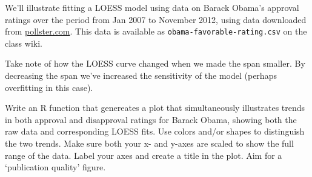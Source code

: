 We'll illustrate fitting a LOESS model using data on Barack Obama's
approval ratings over the period from Jan 2007 to November 2012, using data downloaded from \url{pollster.com}. This data is available as  \lstinline!obama-favorable-rating.csv! on the class wiki.
%
Take note of how the LOESS curve changed when we made the span smaller.
By decreasing the span we've increased the sensitivity of the model
(perhaps overfitting in this case).

\medskip
\begin{assignment}
Write an R function that genereates a plot that
simultaneously illustrates trends in both approval and disapproval
ratings for Barack Obama, showing both the raw data and corresponding
LOESS fits. Use colors and/or shapes to distinguish the two trends. Make
sure both your x- and y-axes are scaled to show the full range of the
data. Label your axes and create a title in the plot. Aim for a
`publication quality' figure.
\end{assignment}





